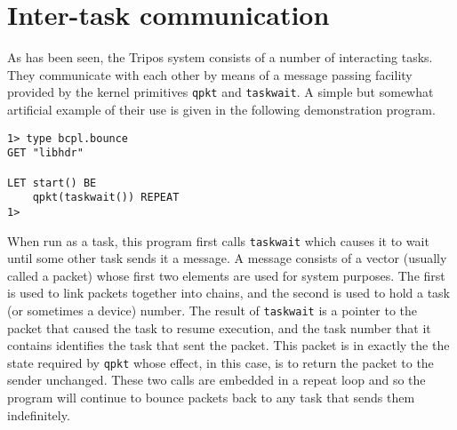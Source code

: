 \section{Inter-task communication}

     As has been seen, the Tripos system consists of a number of
interacting tasks.  They communicate with each other by means of a
message passing facility provided by the kernel primitives \verb|qpkt|
and \verb|taskwait|.  A simple but somewhat artificial example of
their use is given in the following demonstration program.
\begin{verbatim}
1> type bcpl.bounce
GET "libhdr"

LET start() BE
    qpkt(taskwait()) REPEAT
1>
\end{verbatim}
When run as a task, this program first calls \verb|taskwait| which
causes it to wait until some other task sends it a message.  A message
consists of a vector (usually called a packet) whose first two
elements are used for system purposes.  The first is used to link
packets together into chains, and the second is used to hold a task
(or sometimes a device) number.  The result of \verb|taskwait| is a
pointer to the packet that caused the task to resume execution, and
the task number that it contains identifies the task that sent the
packet.  This packet is in exactly the the state required by
\verb|qpkt| whose effect, in this case, is to return the packet to the
sender unchanged.  These two calls are embedded in a repeat loop and
so the program will continue to bounce packets back to any task that
sends them indefinitely.

